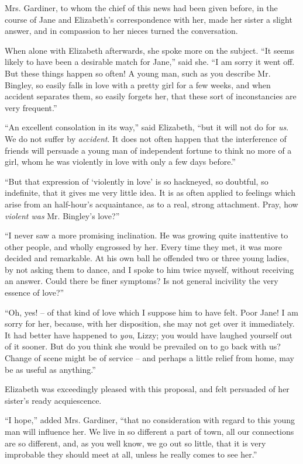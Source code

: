Mrs. Gardiner, to whom the chief of this news had been
given before, in the course of Jane and Elizabeth’s
correspondence with her, made her sister a slight answer, and
in compassion to her nieces turned the conversation.

When alone with Elizabeth afterwards, she spoke more
on the subject. “It seems likely to have been a desirable
match for Jane,” said she. “I am sorry it went off.
But these things happen so often! A young man, such as
you describe Mr. Bingley, so easily falls in love with
a pretty girl for a few weeks, and when accident separates
them, so easily forgets her, that these sort of inconstancies
are very frequent.”

“An excellent consolation in its way,” said Elizabeth,
“but it will not do for \textit{us}. We do not suffer by \textit{accident}.
It does not often happen that the interference of friends
will persuade a young man of independent fortune to
think no more of a girl, whom he was violently in love
with only a few days before.”

“But that expression of ‘violently in love’ is so
hackneyed, so doubtful, so indefinite, that it gives me
very little idea. It is as often applied to feelings which
arise from an half-hour’s acquaintance, as to a real,
strong attachment. Pray, how \textit{violent was} Mr. Bingley’s
love?”

“I never saw a more promising inclination. He was
growing quite inattentive to other people, and wholly
engrossed by her. Every time they met, it was more
decided and remarkable. At his own ball he offended two
or three young ladies, by not asking them to dance, and
I spoke to him twice myself, without receiving an answer.
Could there be finer symptoms? Is not general incivility
the very essence of love?”

“Oh, yes! -- of that kind of love which I suppose him
to have felt. Poor Jane! I am sorry for her, because,
with her disposition, she may not get over it immediately.
It had better have happened to \textit{you}, Lizzy; you would
have laughed yourself out of it sooner. But do you think
she would be prevailed on to go back with us? Change
of scene might be of service -- and perhaps a little relief
from home, may be as useful as anything.”

Elizabeth was exceedingly pleased with this proposal,
and felt persuaded of her sister’s ready acquiescence.

“I hope,” added Mrs. Gardiner, “that no consideration
with regard to this young man will influence her. We live
in so different a part of town, all our connections are so
different, and, as you well know, we go out so little, that
it is very improbable they should meet at all, unless he
really comes to see her.”

